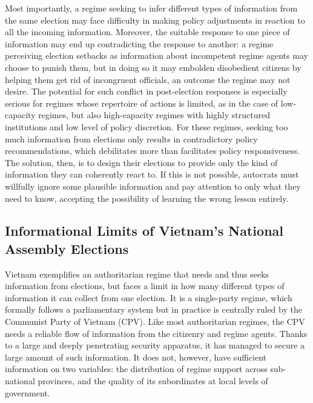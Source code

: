 \documentclass[12pt]{article}
\newcommand{\1}{\mathbbm{1}}
\begin{document}
Most importantly, a regime seeking to infer different types of information from the same election may face difficulty in making policy adjustments in reaction to all the incoming information. Moreover, the suitable response to one piece of information may end up contradicting the response to another: a regime perceiving election setbacks as information about incompetent regime agents may choose to punish them, but in doing so it may embolden disobedient citizens by helping them get rid of incongruent officials, an outcome the regime may not desire. The potential for such conflict in post-election responses is especially serious for regimes whose repertoire of actions is limited, as in the case of low-capacity regimes, but also high-capacity regimes with highly structured institutions and low level of policy discretion. For these regimes, seeking too much information from elections only results in contradictory policy recommendations, which debilitates more than facilitates policy responsiveness. The solution, then, is to design their elections to provide only the kind of information they can coherently react to. If this is not possible, autocrats must willfully ignore some plausible information and pay attention to only what they need to know, accepting the possibility of learning the wrong lesson entirely. 

\subsection{Informational Limits of Vietnam's National Assembly Elections}
\label{sec:vietnam_limits}
Vietnam exemplifies an authoritarian regime that needs and thus seeks information from elections, but faces a limit in how many different types of information it can collect from one election. It is a single-party regime, which formally follows a parliamentary system but in practice is centrally ruled by the Communist Party of Vietnam (CPV). Like most authoritarian regimes, the CPV needs a reliable flow of information from the citizenry and regime agents. Thanks to a large and deeply penetrating security apparatus, it has managed to secure a large amount of such information. It does not, however, have sufficient information on two variables: the distribution of regime support across sub-national provinces, and the quality of its subordinates at local levels of government. 
\end{document}
